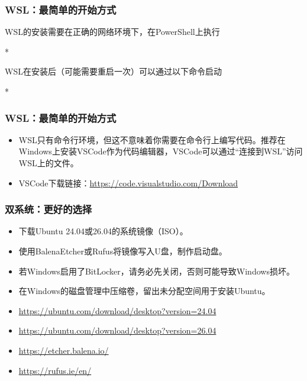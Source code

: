 \begin{frame}
    \frametitle{WSL：最简单的开始方式}
    WSL的安装需要在\alert{正确的网络环境}下，在PowerShell上执行
    \begin{Code}*
        
    \end{Code}
    WSL在安装后（可能需要重启一次）可以通过以下命令启动
    \begin{Code}*
        
    \end{Code}
\end{frame}

\begin{frame}
    \frametitle{WSL：最简单的开始方式}
    \begin{itemize}
        \item WSL只有命令行环境，但这不意味着你需要在命令行上编写代码。推荐在Windows上安装VSCode作为代码编辑器，VSCode可以通过“连接到WSL”访问WSL上的文件。
        \item VSCode下载链接：\url{https://code.visualstudio.com/Download}
    \end{itemize}
\end{frame}

\begin{frame}
    \frametitle{双系统：更好的选择}
    \begin{itemize}
        \item 下载Ubuntu 24.04或26.04的系统镜像（ISO）。
        \item 使用BalenaEtcher或Rufus将镜像写入U盘，制作启动盘。
        \item 若Windows启用了BitLocker，\alert{请务必先关闭，否则可能导致Windows损坏}。
        \item 在Windows的磁盘管理中压缩卷，留出未分配空间用于安装Ubuntu。
        \item \url{https://ubuntu.com/download/desktop?version=24.04}
        \item \url{https://ubuntu.com/download/desktop?version=26.04}
        \item \url{https://etcher.balena.io/}
        \item \url{https://rufus.ie/en/}
    \end{itemize}
\end{frame}


